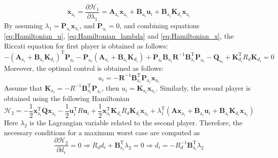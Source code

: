 \documentclass[3p]{elsarticle}
\begin{document}
\begin{equation}\label{eq:Hamiltonian_x}
    \dot{\mathbf{x}}_{\mathrm{a}_i}  = \dfrac{\partial \mathcal{H}_1}{\partial \lambda_1} = \mathbf{A}_{\mathrm{a}_i} \mathbf{x}_{\mathrm{a}_i}  + \mathbf{B}_{\mathrm{a}_i} \mathbf{u}_i + \mathbf{B}_{\mathrm{a}_i} \mathbf{K}_{d_i} \mathbf{x}_{\mathrm{a}_i} 
\end{equation}
By assuming $\lambda_1 = \mathbf{P}_{\mathrm{a}_i}\mathbf{x}_{\mathrm{a}_i}$, 
 and $\dot{\mathbf{P}}_{\mathrm{a}_i} = 0$, and combining equations \eqref{eq:Hamiltonian_u}, \eqref{eq:Hamiltonian_lambda} and \eqref{eq:Hamiltonian_x}, the Riccati equation for first player is obtained as follows:
\begin{equation}\label{eq:riccatti}
    -( \mathbf{A}_{\mathrm{a}_i} + \mathbf{B}_{\mathrm{a}_i}\mathbf{K}_{d_i})^\mathrm{T} \mathbf{P}_{\mathrm{a}_i} - \mathbf{P}_{\mathrm{a}_i} (\mathbf{A}_{\mathrm{a}_i} + \mathbf{B}_{\mathrm{a}_i}\mathbf{K}_{d_i}) + \mathbf{P}_{\mathrm{a}_i} \mathbf{B}_{\mathrm{a}_i} \mathbf{R}^{-1} \mathbf{B}_{\mathrm{a}_i}^\mathrm{T} \mathbf{P}_{\mathrm{a}_i} - \mathbf{Q}_{\mathrm{a}_i}  + \mathbf{K}_{d_i}^\mathrm{T} R_{d} \mathbf{K}_{d_i} = 0 
\end{equation}
Moreover, the optimal control is obtained as follows:
\begin{equation}
    u_i = -\mathbf{R}^{-1}\mathbf{B}_{\mathrm{a}_i}^\mathrm{T}\mathbf{P}_{\mathrm{a}_i}\mathbf{x}_{\mathrm{a}_i}
\end{equation}
Assume that $\mathbf{K}_{\mathrm{a}_i} = -R^{-1} \mathbf{B}_{\mathrm{a}_i}^\mathrm{T}\mathbf{P}_{\mathrm{a}_i}$, then $u_i = \mathbf{K}_{\mathrm{a}_i}\mathbf{x}_{\mathrm{a}_i}$. Similarly, the second player is obtained using the following Hamiltonian 
\begin{equation}
    \mathcal{H}_2 = -\dfrac{1}{2}\mathbf{x}_{\mathrm{a}_i}^\mathrm{T} \mathbf{Q} \mathbf{x}_{\mathrm{a}_i} - \dfrac{1}{2}\mathbf{u}_i^\mathrm{T} R \mathbf{u}_i + \dfrac{1}{2}\mathbf{x}_{\mathrm{a}_i}^\mathrm{T} \mathbf{K}_{d_i} R_{d} \mathbf{K}_{d_i}  \mathbf{x}_{\mathrm{a}_i} + \lambda_1^\mathrm{T}(\mathbf{A}\mathbf{x}_{\mathrm{a}_i} + \mathbf{B}_{\mathrm{a}_i}\mathbf{u}_i + \mathbf{B}_{\mathrm{a}_i}\mathbf{K}_{d_i}\mathbf{x}_{\mathrm{a}_i}) 
\end{equation}
Here $\lambda_2$ is the Lagrangian variable related to the second player. Therefore, the necessary conditions for a maximum worst case are computed as
\begin{equation}\label{eq:Hamiltonian_d}
    \dfrac{\partial \mathcal{H}_2}{\partial d_i} = 0 \Rightarrow R_d d_i + \mathbf{B}_{\mathrm{a}_i}^\mathrm{T}\lambda_2 = 0 \Rightarrow d_i = -R_d^{-1}\mathbf{B}_{\mathrm{a}_i}^\mathrm{T}\lambda_2
\end{equation}
\end{document}
